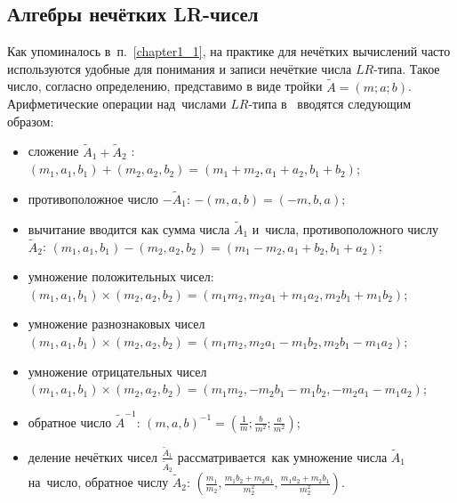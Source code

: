 \subsection{Алгебры нечётких LR-чисел}
Как упоминалось в~п.~\ref{chapter1_1}, на практике для нечётких вычислений часто используются удобные для понимания и записи нечёткие числа $LR$-типа. Такое число, согласно определению, представимо в виде тройки $\tilde{A}=\left( m;a;b \right)$. Арифметические операции над~числами $LR$-типа в~\cite{Pospelov, Yakhyaeva, Borisov} вводятся следующим образом:
\begin{itemize}
	\item сложение ${{\tilde{A}}_{1}}+{{\tilde{A}}_{2}}$ : $\left( {{m}_{1}},{{a}_{1}},{{b}_{1}} \right)+\left( {{m}_{2}},{{a}_{2}},{{b}_{2}} \right)=\left( {{m}_{1}}+{{m}_{2}},{{a}_{1}}+{{a}_{2}},{{b}_{1}}+{{b}_{2}} \right)$;
	\item противоположное число $-{{\tilde{A}}_{1}}$: $-\left( m,a,b \right)=\left( -m,b,a \right)$;
	\item вычитание вводится как сумма числа ${{\tilde{A}}_{1}}$ и~числа, противоположного числу ${{\tilde{A}}_{2}}$: $\left( {{m}_{1}},{{a}_{1}},{{b}_{1}} \right)-\left( {{m}_{2}},{{a}_{2}},{{b}_{2}} \right)=\left( {{m}_{1}}-{{m}_{2}},{{a}_{1}}+{{b}_{2}},{{b}_{1}}+{{a}_{2}} \right)$;
	\item умножение положительных чисел: $\left( {{m}_{1}},{{a}_{1}},{{b}_{1}} \right)\times \left( {{m}_{2}},{{a}_{2}},{{b}_{2}} \right)=\left( {{m}_{1}}{{m}_{2}},{{m}_{2}}{{a}_{1}}+{{m}_{1}}{{a}_{2}},{{m}_{2}}{{b}_{1}}+{{m}_{1}}{{b}_{2}} \right)$;
	\item умножение разнознаковых чисел $\left( {{m}_{1}},{{a}_{1}},{{b}_{1}} \right)\times \left( {{m}_{2}},{{a}_{2}},{{b}_{2}} \right)=\left( {{m}_{1}}{{m}_{2}},{{m}_{2}}{{a}_{1}}-{{m}_{1}}{{b}_{2}},{{m}_{2}}{{b}_{1}}-{{m}_{1}}{{a}_{2}} \right)$;
	\item умножение отрицательных чисел $\left( {{m}_{1}},{{a}_{1}},{{b}_{1}} \right)\times \left( {{m}_{2}},{{a}_{2}},{{b}_{2}} \right)=\left( {{m}_{1}}{{m}_{2}},-{{m}_{2}}{{b}_{1}}-{{m}_{1}}{{b}_{2}},-{{m}_{2}}{{a}_{1}}-{{m}_{1}}{{a}_{2}} \right)$;
	\item обратное число $\displaystyle {\tilde A}^{-1}$: ${{\left( m,a,b \right)}^{-1}}=\left( \frac{1}{m};\frac{b}{{{m}^{2}}};\frac{a}{{{m}^{2}}} \right)$;
	\item деление нечётких чисел $\displaystyle \frac{{{{\tilde{A}}}_{1}}}{{{{\tilde{A}}}_{2}}}$ рассматривается~как умножение числа ${{\tilde{A}}_{1}}$ на~число, обратное числу ${{\tilde{A}}_{2}}$: $\displaystyle \left( \frac{{{m}_{1}}}{{{m}_{2}}},\frac{{{m}_{1}}{{b}_{2}}+{{m}_{2}}{{a}_{1}}}{m_{2}^{2}},\frac{{{m}_{1}}{{a}_{2}}+{{m}_{2}}{{b}_{1}}}{m_{2}^{2}} \right)$.
\end{itemize}

